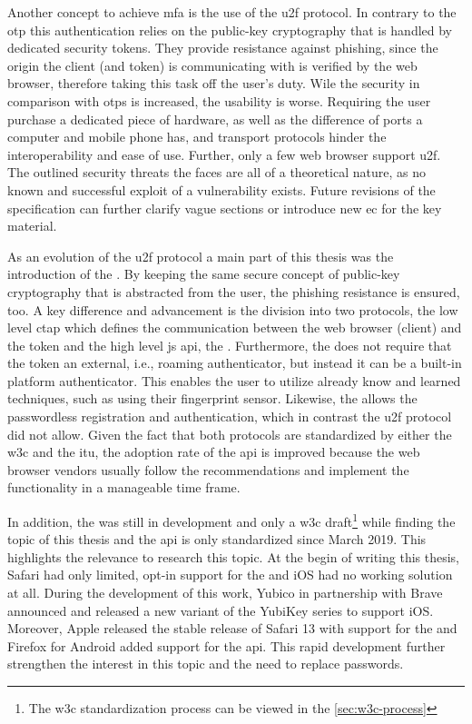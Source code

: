 Another concept to achieve \gls{mfa} is the use of the \gls{u2f} protocol. In contrary to the \gls{otp} this authentication relies on the public-key cryptography that is handled by dedicated security tokens. They provide resistance against phishing, since the origin the client (and token) is communicating with is verified by the web browser, therefore taking this task off the user's duty. Wile the security in comparison with \glspl{otp} is increased, the usability is worse. Requiring the user purchase a dedicated piece of hardware, as well as the difference of ports a computer and mobile phone has, and transport protocols hinder the interoperability and ease of use. Further, only a few web browser support \gls{u2f}. The outlined security threats the \wa{} faces are all of a theoretical nature, as no known and successful exploit of a vulnerability exists. Future revisions of the specification can further clarify vague sections or introduce new \gls{ec} for the key material.

As an evolution of the \gls{u2f} protocol a main part of this thesis was the introduction of the \wa. By keeping the same secure concept of public-key cryptography that is abstracted from the user, the phishing resistance is ensured, too. A key difference and advancement is the division into two protocols, the low level \gls{ctap} which defines the communication between the web browser (client) and the token and the high level \gls{js} \gls{api}, the \wa{}. Furthermore, the \wa{} does not require that the token an external, i.e., roaming authenticator, but instead it can be a built-in platform authenticator. This enables the user to utilize already know and learned techniques, such as using their fingerprint sensor. Likewise, the \wa{} allows the passwordless registration and authentication, which in contrast the \gls{u2f} protocol did not allow. Given the fact that both protocols are standardized by either the \gls{w3c} and the \gls{itu}, the adoption rate of the \gls{api} is improved because the web browser vendors usually follow the recommendations and implement the functionality in a manageable time frame. 

\newpage

In addition, the \wa{} was still in development and only a \gls{w3c} draft\footnote{The \gls{w3c} standardization process can be viewed in the \autoref{sec:w3c-process}} while finding the topic of this thesis and the \gls{api} is only standardized since March 2019. This highlights the relevance to research this topic. At the begin of writing this thesis, Safari had only limited, opt-in support for the \wa and iOS had no working solution at all. During the development of this work, Yubico in partnership with Brave announced and released a new variant of the YubiKey series to support iOS. Moreover, Apple released the stable release of Safari 13 with support for the \wa{} and Firefox for Android added support for the \gls{api}. This rapid development further strengthen the interest in this topic and the need to replace passwords. 

